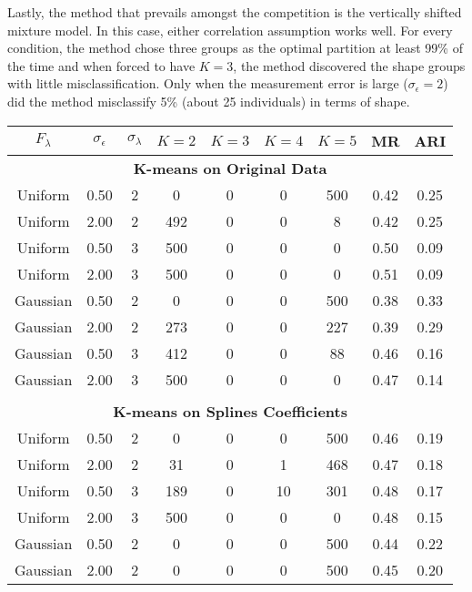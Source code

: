 Lastly, the method that prevails amongst the competition is the vertically shifted mixture model. In this case, either correlation assumption works well. For every condition, the method chose three groups as the optimal partition at least 99\% of the time and when forced to have $K=3$, the method discovered the shape groups with little misclassification. Only when the measurement error is large ($\sigma_{\epsilon}=2$) did the method misclassify 5\% (about 25 individuals) in terms of shape. 

\begin{table}[ht]
\centering
\begin{tabular}{ccc|cccccc}
  \thickhline  $F_{\lambda}$&$\sigma_{\epsilon}$&$\sigma_{\lambda}$&$K=2$&$K=3$&$K=4$&$K=5$&MR&ARI\\ \hline\multicolumn{9}{c}{\textbf{K-means on Original Data}}\\ Uniform & 0.50 &   2 &   0 &   0 &   0 & 500 & 0.42 & 0.25 \\ 
  Uniform & 2.00 &   2 & 492 &   0 &   0 &   8 & 0.42 & 0.25 \\ 
  Uniform & 0.50 &   3 & 500 &   0 &   0 &   0 & 0.50 & 0.09 \\ 
  Uniform & 2.00 &   3 & 500 &   0 &   0 &   0 & 0.51 & 0.09 \\ 
  Gaussian & 0.50 &   2 &   0 &   0 &   0 & 500 & 0.38 & 0.33 \\ 
  Gaussian & 2.00 &   2 & 273 &   0 &   0 & 227 & 0.39 & 0.29 \\ 
  Gaussian & 0.50 &   3 & 412 &   0 &   0 &  88 & 0.46 & 0.16 \\ 
  Gaussian & 2.00 &   3 & 500 &   0 &   0 &   0 & 0.47 & 0.14 \\ 
   \\ \multicolumn{9}{c}{\textbf{K-means on Splines Coefficients}}\\Uniform & 0.50 &   2 &   0 &   0 &   0 & 500 & 0.46 & 0.19 \\ 
  Uniform & 2.00 &   2 &  31 &   0 &   1 & 468 & 0.47 & 0.18 \\ 
  Uniform & 0.50 &   3 & 189 &   0 &  10 & 301 & 0.48 & 0.17 \\ 
  Uniform & 2.00 &   3 & 500 &   0 &   0 &   0 & 0.48 & 0.15 \\ 
  Gaussian & 0.50 &   2 &   0 &   0 &   0 & 500 & 0.44 & 0.22 \\ 
  Gaussian & 2.00 &   2 &   0 &   0 &   0 & 500 & 0.45 & 0.20 \\ 

\end{tabular}
\end{table}
